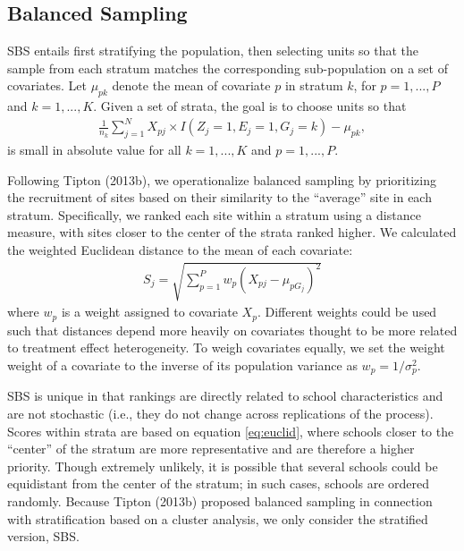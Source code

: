 \documentclass[
  english,
  man,floatsintext]{apa6}
\begin{document}
\hypertarget{balanced-sampling}{%
\subsection{Balanced Sampling}\label{balanced-sampling}}

SBS entails first stratifying the population, then selecting units so that the sample from each stratum matches the corresponding sub-population on a set of covariates. Let \(\mu_{p k}\) denote the mean of covariate \(p\) in stratum \(k\), for \(p = 1,...,P\) and \(k = 1,...,K\). Given a set of strata, the goal is to choose units so that
\begin{align}
\frac{1}{n_k} \sum_{j=1}^N X_{pj} \times I\left(Z_j = 1, E_j = 1, G_j = k\right) - \mu_{p k},
\end{align}
is small in absolute value for all \(k = 1,...,K\) and \(p = 1,...,P\).

Following Tipton (2013b), we operationalize balanced sampling by prioritizing the recruitment of sites based on their similarity to the \enquote{average} site in each stratum.
Specifically, we ranked each site within a stratum using a distance measure, with sites closer to the center of the strata ranked higher. We calculated the weighted Euclidean distance to the mean of each covariate:
\begin{align} \label{eq:euclid}
S_j = \sqrt{\sum^P_{p=1}w_p(X_{pj} - \mu_{p G_j})^2}
\end{align}
where \(w_p\) is a weight assigned to covariate \(X_p\). Different weights could be used such that distances depend more heavily on covariates thought to be more related to treatment effect heterogeneity. To weigh covariates equally, we set the weight weight of a covariate to the inverse of its population variance as \(w_p = 1/\sigma^2_p\).

SBS is unique in that rankings are directly related to school characteristics and are not stochastic (i.e., they do not change across replications of the process).
Scores within strata are based on equation \eqref{eq:euclid}, where schools closer to the \enquote{center} of the stratum are more representative and are therefore a higher priority. Though extremely unlikely, it is possible that several schools could be equidistant from the center of the stratum; in such cases, schools are ordered randomly. Because Tipton (2013b) proposed balanced sampling in connection with stratification based on a cluster analysis, we only consider the stratified version, SBS.
\end{document}
